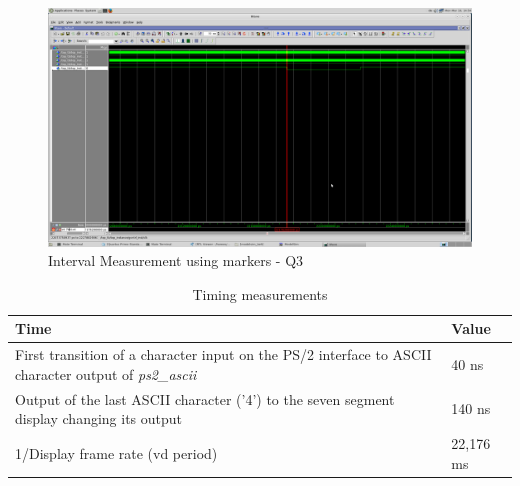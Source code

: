 \documentclass[11pt,a4paper,titlepage,oneside]{article}
\begin{document}
\begin{figure}[ht!]
	\centering
	\includegraphics[width=1.0\linewidth]{ThirdQ - Table1.png} 
	\caption{Interval Measurement using markers - Q3}
\end{figure}

\begin{table}[ht!]
	\centering
	\caption{Timing measurements}
		\begin{tabular}{|p{}|l|}
		\hline
		Time                                                                 & Value  \\ \hline 
		First transition of a character input on the PS/2 interface to ASCII character output of \emph{ps2\_ascii} & 40 ns   \\
		Output of the last ASCII character ('4') to the seven segment display changing its output                       & 140 ns   \\
		1/Display frame rate (\textsf{vd} period)                        & 22,176 ms   \\ \hline
	\end{tabular}
\end{table}

%
%

\begin{qa}
\end{qa}
\end{document}
